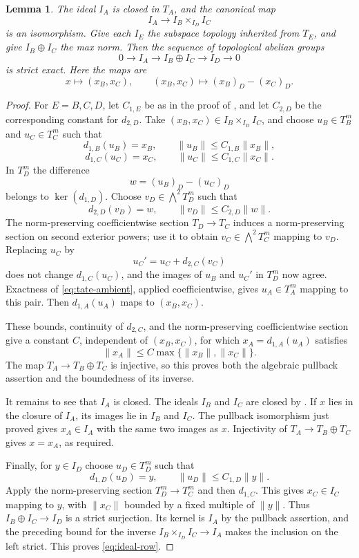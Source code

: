 \documentclass[11pt,reqno]{amsart}
\newtheorem{lemma}[lemma]{Lemma}
\theoremstyle{definition}
\begin{document}
\begin{lemma}\label{lem:graph-pullback}
The ideal $I_A$ is closed in $T_A$, and the canonical map
\[
  I_A\longrightarrow I_B\times_{I_D}I_C
\]
is an isomorphism.  Give each $I_E$ the subspace topology inherited from
$T_E$, and give $I_B\oplus I_C$ the max norm.  Then the sequence of
topological abelian groups
\begin{equation}\label{eq:ideal-row}
  0\longrightarrow I_A\longrightarrow I_B\oplus I_C
  \longrightarrow I_D\longrightarrow0
\end{equation}
is strict exact.  Here the maps are
\[
  x\longmapsto(x_B,x_C),
  \qquad
  (x_B,x_C)\longmapsto (x_B)_D-(x_C)_D.
\]
\end{lemma}

\begin{proof}
For $E=B,C,D$, let $C_{1,E}$ be as in the proof of
, and let $C_{2,D}$ be the corresponding constant for
$d_{2,D}$.  Take
$(x_B,x_C)\in I_B\times_{I_D}I_C$, and choose
$u_B\in T_B^m$ and $u_C\in T_C^m$ such that
\[
  d_{1,B}(u_B)=x_B,\qquad
  \lVert u_B\rVert\leq C_{1,B}\lVert x_B\rVert,
\]
\[
  d_{1,C}(u_C)=x_C,\qquad
  \lVert u_C\rVert\leq C_{1,C}\lVert x_C\rVert.
\]
In $T_D^m$
the difference
\[
  w=(u_B)_D-(u_C)_D
\]
belongs to $\ker(d_{1,D})$.  Choose
$v_D\in\bigwedge^2T_D^m$ such that
\[
  d_{2,D}(v_D)=w,\qquad
  \lVert v_D\rVert\leq C_{2,D}\lVert w\rVert.
\]
The norm-preserving coefficientwise section $T_D\to T_C$ induces a
norm-preserving section on second exterior powers; use it to obtain
$v_C\in\bigwedge^2T_C^m$ mapping to $v_D$.  Replacing $u_C$ by
\[
  u_C'=u_C+d_{2,C}(v_C)
\]
does not change $d_{1,C}(u_C)$, and the images of $u_B$ and $u_C'$ in
$T_D^m$ now agree.  Exactness of \eqref{eq:tate-ambient}, applied
coefficientwise, gives $u_A\in T_A^m$ mapping to this pair.  Then
$d_{1,A}(u_A)$ maps to $(x_B,x_C)$.

These bounds, continuity of $d_{2,C}$, and the norm-preserving
coefficientwise section give a constant $C$, independent
of $(x_B,x_C)$, for which $x_A=d_{1,A}(u_A)$ satisfies
\[
  \lVert x_A\rVert\leq
  C\max\{\lVert x_B\rVert,\lVert x_C\rVert\}.
\]
The map $T_A\to T_B\oplus T_C$ is injective, so this proves both the
algebraic pullback assertion and the boundedness of its inverse.

It remains to see that $I_A$ is closed.  The ideals $I_B$ and $I_C$ are
closed by .  If $x$ lies in the closure of $I_A$, its images
lie in $I_B$ and $I_C$.  The pullback isomorphism just proved gives
$x_A\in I_A$ with the same two images as $x$.  Injectivity of
$T_A\to T_B\oplus T_C$ gives $x=x_A$, as required.

Finally, for $y\in I_D$ choose $u_D\in T_D^m$ such that
\[
  d_{1,D}(u_D)=y,\qquad
  \lVert u_D\rVert\leq C_{1,D}\lVert y\rVert.
\]
Apply the norm-preserving section $T_D^m\to T_C^m$ and then $d_{1,C}$.
This gives $x_C\in I_C$ mapping to $y$, with $\lVert x_C\rVert$ bounded
by a fixed multiple of $\lVert y\rVert$.  Thus
$I_B\oplus I_C\to I_D$ is a strict surjection.  Its kernel is $I_A$ by
the pullback assertion, and the preceding bound for the inverse
$I_B\times_{I_D}I_C\to I_A$ makes the inclusion on the left strict.
This proves \eqref{eq:ideal-row}.
\end{proof}
\end{document}
